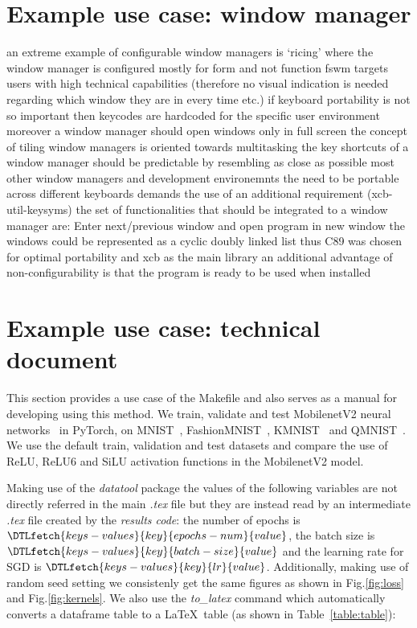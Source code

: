 \documentclass[journal]{IEEEtran}
\begin{document}
\section{Example use case: window manager}
an extreme example of configurable window managers is `ricing' where the window manager is configured mostly for form and not function
fswm targets users with high technical capabilities (therefore no visual indication is needed regarding which window they are in every time etc.)
if keyboard portability is not so important then keycodes are hardcoded for the specific user environment
moreover a window manager should open windows only in full screen
the concept of tiling window managers is oriented towards multitasking
the key shortcuts of a window manager should be predictable by resembling as close as possible most other window managers and development environemnts
the need to be portable across different keyboards demands the use of an additional requirement (xcb-util-keysyms)
the set of functionalities that should be integrated to a window manager are: Enter next/previous window and open program in new window
the windows could be represented as a cyclic doubly linked list
thus C89 was chosen for optimal portability and xcb as the main library
an additional advantage of non-configurability is that the program is ready to be used when installed

\section{Example use case: technical document}
This section provides a use case of the Makefile and also serves as a manual for developing using this method.
We train, validate and test MobilenetV2 neural networks~\cite{sandler2018mobilenetv2} in PyTorch, on MNIST~\cite{lecun2010mnist}, FashionMNIST~\cite{xiao2017fashion}, KMNIST~\cite{clanuwat2018deep} and QMNIST~\cite{yadav2019cold}.
We use the default train, validation and test datasets and compare the use of ReLU, ReLU6\cite{dahl2013improving} and SiLU\cite{elfwing2018sigmoid} activation functions in the MobilenetV2 model.

Making use of the \textit{datatool} package the values of the following variables are not directly referred in the main \textit{.tex} file but they are instead read by an intermediate \textit{.tex} file created by the \textit{results code}: the number of epochs is $\DTLfetch{keys-values}{key}{epochs-num}{value}$, the batch size is $\DTLfetch{keys-values}{key}{batch-size}{value}$ and the learning rate for SGD is $\DTLfetch{keys-values}{key}{lr}{value}$.
Additionally, making use of random seed setting we consistenly get the same figures as shown in Fig.\ref{fig:loss} and Fig.\ref{fig:kernels}.
We also use the \textit{to\_latex} command which automatically converts a dataframe table to a \LaTeX\ table (as shown in Table~\ref{table:table}):
\end{document}

